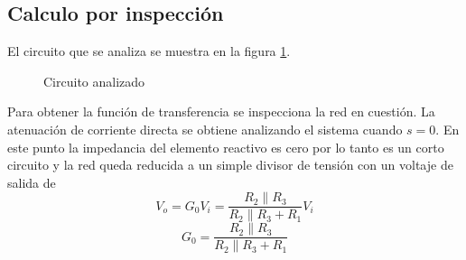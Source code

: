 \documentclass[letterpaper,11pt]{article}
\newcommand{\unidad}[1]{\,\si{#1}}
\begin{document}
	\subsection{Calculo por inspección}
		El circuito que se analiza se muestra en la figura \ref{cir:hpf}. 
		\begin{figure}[h!]
			\centering
			\caption{Circuito analizado}
			\label{cir:hpf}
		\end{figure}
		Para obtener la función de transferencia se inspecciona la red en cuestión. La atenuación de corriente directa se obtiene analizando el sistema cuando $s = 0$. En este punto la impedancia del elemento reactivo es cero por lo tanto es un corto circuito y la red queda reducida a un simple divisor de tensión con un voltaje de salida de
		\[ V_o = G_0 V_i = \frac{R_2 \parallel R_3}{R_2 \parallel R_3 + R_1} V_i\]
		\[ G_0 = \frac{R_2 \parallel R_3}{R_2 \parallel R_3 + R_1} \]
		
\end{document}
